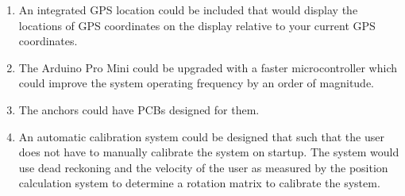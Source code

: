 \begin{enumerate}
	\item An integrated GPS location could be included that would display the locations of GPS coordinates on the display relative to your current GPS coordinates.
	\item The Arduino Pro Mini could be upgraded with a faster microcontroller which could improve the system operating frequency by an order of magnitude.
	\item The anchors could have PCBs designed for them.
	\item An automatic calibration system could be designed that such that the user does not have to manually calibrate the system on startup. The system would use dead reckoning and the velocity of the user as measured by the position calculation system to determine a rotation matrix to calibrate the system.
\end{enumerate}